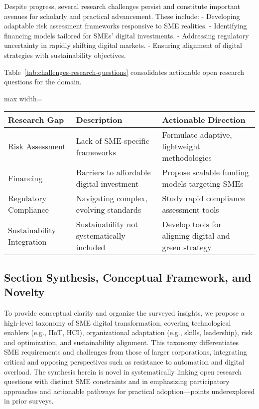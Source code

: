 \documentclass[sigconf]{acmart}
\begin{document}
Despite progress, several research challenges persist and constitute important avenues for scholarly and practical advancement. These include:
\newline
- Developing adaptable risk assessment frameworks responsive to SME realities.
\newline
- Identifying financing models tailored for SMEs’ digital investments.
\newline
- Addressing regulatory uncertainty in rapidly shifting digital markets.
\newline
- Ensuring alignment of digital strategies with sustainability objectives.
\newline

Table~\ref{tab:challenges-research-questions} consolidates actionable open research questions for the domain.

\begin{table*}[htbp]
\centering
\caption{Open Research Questions in SME Digital Transformation: Challenges and Strategies}
\label{tab:challenges-research-questions}
\begin{adjustbox}{max width=\textwidth}
\begin{tabular}{@{}lll@{}}
\toprule
Research Gap & Description & Actionable Direction \\
\midrule
Risk Assessment & Lack of SME-specific frameworks & Formulate adaptive, lightweight methodologies \\
Financing & Barriers to affordable digital investment & Propose scalable funding models targeting SMEs \\
Regulatory Compliance & Navigating complex, evolving standards & Study rapid compliance assessment tools \\
Sustainability Integration & Sustainability not systematically included & Develop tools for aligning digital and green strategy \\
\bottomrule
\end{tabular}
\end{adjustbox}
\end{table*}

\subsection{Section Synthesis, Conceptual Framework, and Novelty}

To provide conceptual clarity and organize the surveyed insights, we propose a high-level taxonomy of SME digital transformation, covering technological enablers (e.g., IIoT, HCI), organizational adaptation (e.g., skills, leadership), risk and optimization, and sustainability alignment. This taxonomy differentiates SME requirements and challenges from those of larger corporations, integrating critical and opposing perspectives such as resistance to automation and digital overload. The synthesis herein is novel in systematically linking open research questions with distinct SME constraints and in emphasizing participatory approaches and actionable pathways for practical adoption—points underexplored in prior surveys.
\end{document}
